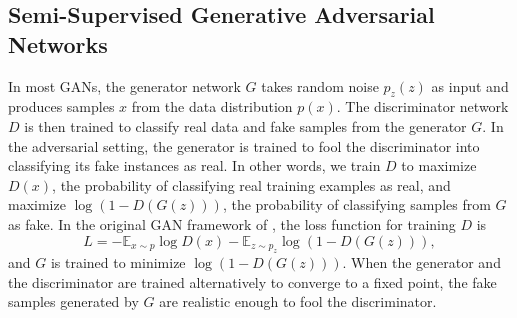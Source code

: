 \subsection{Semi-Supervised Generative Adversarial Networks}

In most GANs, the generator network $G$ takes random noise $p_z \left( z \right)$
as input and produces samples $x$ from the data distribution $p \left( x \right)$.
The discriminator network $D$ is then trained to classify real data and fake samples
from the generator $G$.
In the adversarial setting, the generator is trained to fool the discriminator into classifying its
fake instances as real.
In other words, we train $D$ to maximize $D \left( x \right)$,
the probability of classifying real training examples as real,
and maximize $\log \left( 1 - D \left( G \left( z \right) \right) \right)$,
the probability of classifying samples from $G$ as fake.
In the original GAN framework of \citet{goodfellow2014generative}, the loss function for training $D$ is
\begin{equation}
  L = - \mathbb{E}_{x \sim p} \log D \left( x \right)
      - \mathbb{E}_{z \sim p_z} \log \left( 1 - D \left( G \left( z \right) \right) \right),
  \label{eq:original_gan_loss}
\end{equation}
and $G$ is trained to minimize $\log \left( 1 - D \left( G \left( z \right) \right) \right)$.
When the generator and the discriminator are trained alternatively to converge to a fixed point,
the fake samples generated by $G$ are realistic enough to fool the discriminator.

